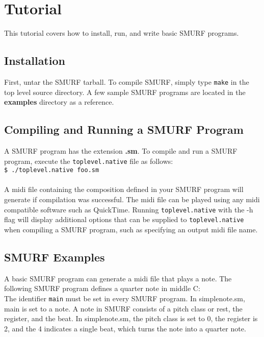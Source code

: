 \section{Tutorial}
This tutorial covers how to install, run, and write basic SMURF programs.

\subsection{Installation} 
First, untar the SMURF tarball. To compile SMURF, simply type \texttt{make} in the top level source directory. A few sample SMURF programs are located in the \textbf{examples} directory as a reference.

\subsection{Compiling and Running a SMURF Program}
A SMURF program has the extension \textbf{.sm}. To compile and run a SMURF program, execute the \texttt{toplevel.native} file as follows:\\

\texttt{\$ ./toplevel.native foo.sm}\\\\
A midi file containing the composition defined in your SMURF program will generate if compilation was successful. The midi file can be played using any midi compatible software such as QuickTime. Running \texttt{toplevel.native} with the -h flag will display additional options that can be supplied to \texttt{toplevel.native} when compiling a SMURF program, such as specifying an output midi file name.

\subsection{SMURF Examples}

A basic SMURF program can generate a midi file that plays a note. The following SMURF program defines a quarter note in middle C:\\



The identifier \texttt{main} must be set in every SMURF program. In simplenote.sm, main is set to a note.  A note in SMURF consists of a pitch class or rest, the register, and the beat. In simplenote.sm, the pitch class is set to 0, the register is 2, and the 4 indicates a single beat, which turns the note into a quarter note.

